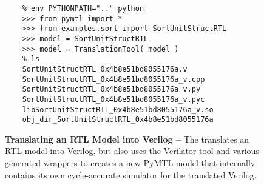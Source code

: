 
\begin{figure}

\begin{minipage}[t]{0.5\tw}
  \begin{lstlisting}[gobble=4]
    % cd ${TUTROOT}/build
    % env PYTHONPATH=".." python
    >>> from pymtl import *
    >>> from examples.sort import SortUnitStructRTL
    >>> model = SortUnitStructRTL
    >>> model = TranslationTool( model )
    % ls
    SortUnitStructRTL_0x4b8e51bd8055176a.v
    SortUnitStructRTL_0x4b8e51bd8055176a_v.cpp
    SortUnitStructRTL_0x4b8e51bd8055176a_v.py
    SortUnitStructRTL_0x4b8e51bd8055176a_v.pyc
    libSortUnitStructRTL_0x4b8e51bd8055176a_v.so
    obj_dir_SortUnitStructRTL_0x4b8e51bd8055176a
\end{lstlisting}
\end{minipage}
\hfill
\begin{minipage}[t]{0.47\tw}
  \caption{\textbf{Translating an RTL Model into Verilog --} The
     translates an RTL model into Verilog, but also
    uses the Verilator tool and various generated wrappers to creates a
    new PyMTL model that internally contains its own cycle-accurate
    simulator for the translated Verilog.}
  \label{code-tut3-sort-translate}
\end{minipage}

\end{figure}

